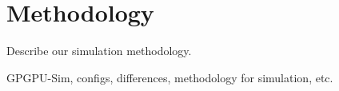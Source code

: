 \section{Methodology}

Describe our simulation methodology. 

GPGPU-Sim, configs, differences, methodology for simulation, etc.
